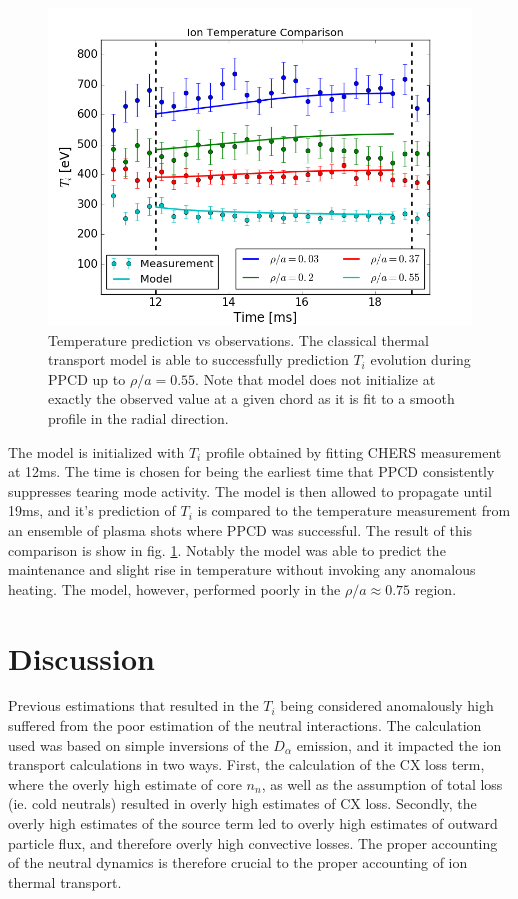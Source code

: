 \documentclass[aip, pop, preprint]{revtex4-1}
\begin{document}
\begin{figure}[!ht]
	\centering
	\includegraphics[width=0.95\columnwidth]{./plots/temp_comp_ext}
	\caption{Temperature prediction vs observations. The classical thermal transport model is able to successfully prediction $T_i$ evolution during PPCD up to $\rho /a = 0.55$. Note that model does not initialize at exactly the observed value at a given chord as it is fit to a smooth profile in the radial direction.\label{fig:comp}}
\end{figure}

The model is initialized with $T_i$ profile obtained by fitting CHERS
measurement at 12ms. The time is chosen for being the earliest time that PPCD
consistently suppresses tearing mode activity. The model is then allowed to
propagate until 19ms, and it's prediction of $T_i$ is compared to the
temperature measurement from an ensemble of plasma shots where PPCD was
successful. The result of this comparison is show in fig. \ref{fig:comp}.
Notably the model was able to predict the maintenance and slight rise in
temperature without invoking any anomalous heating. The model, however,
performed poorly in the $\rho /a \approx 0.75$ region.

\section{Discussion}
Previous estimations that resulted in the $T_i$ being considered anomalously
high suffered from the poor estimation of the neutral
interactions\cite{Fiksel2006}. The calculation used was based on
simple inversions of the $D_{\alpha}$ emission, and it impacted the ion transport
calculations in two ways. First, the calculation of the CX loss term, where the
overly high estimate of core $n_n$, as well as the assumption of total loss
(ie. cold neutrals) resulted in overly high estimates of CX loss. Secondly, the
overly high estimates of the source term led to overly high estimates of
outward particle flux, and therefore overly high convective losses. The proper
accounting of the neutral dynamics is therefore crucial to the proper
accounting of ion thermal transport. 
\end{document}
